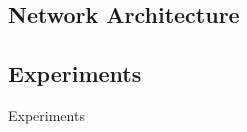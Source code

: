 \documentclass[conference]{IEEEtran}
\begin{document}
	 
	 
	\subsection{Network Architecture}
	
	




\subsection{Experiments} \label{Experiments}
Experiments 
\end{document}
